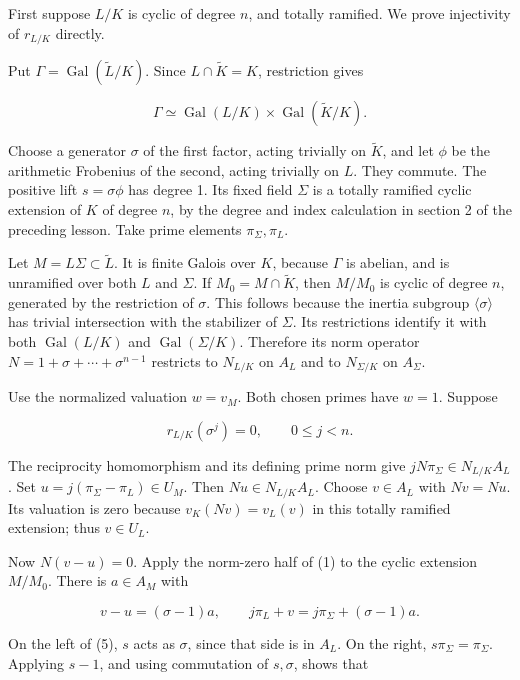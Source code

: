 \documentclass[11pt,a4paper]{article}
\begin{document}
First suppose \(L/K\) is cyclic of degree \(n\), and totally ramified.
We prove injectivity of \(r_{L/K}\) directly.

Put \(\Gamma=\operatorname{Gal}(\widetilde L/K)\). Since
\(L\cap\widetilde K=K\), restriction gives

\[
\Gamma\simeq\operatorname{Gal}(L/K)\times
\operatorname{Gal}(\widetilde K/K).
\]

Choose a generator \(\sigma\) of the first factor, acting trivially on
\(\widetilde K\), and let \(\phi\) be the arithmetic Frobenius of the
second, acting trivially on \(L\). They commute. The positive lift
\(s=\sigma\phi\) has degree 1. Its fixed field \(\Sigma\) is a totally
ramified cyclic extension of \(K\) of degree \(n\), by the degree and
index calculation in section 2 of the preceding lesson. Take prime
elements \(\pi_\Sigma,\pi_L\).

Let \(M=L\Sigma\subset\widetilde L\). It is finite Galois over \(K\),
because \(\Gamma\) is abelian, and is unramified over both \(L\) and
\(\Sigma\). If \(M_0=M\cap\widetilde K\), then \(M/M_0\) is cyclic of
degree \(n\), generated by the restriction of \(\sigma\). This follows
because the inertia subgroup \(\langle\sigma\rangle\) has trivial
intersection with the stabilizer of \(\Sigma\). Its restrictions
identify it with both \(\operatorname{Gal}(L/K)\) and
\(\operatorname{Gal}(\Sigma/K)\). Therefore its norm operator
\(N=1+\sigma+\cdots+\sigma^{n-1}\) restricts to \(N_{L/K}\) on \(A_L\)
and to \(N_{\Sigma/K}\) on \(A_\Sigma\).

Use the normalized valuation \(w=v_M\). Both chosen primes have \(w=1\).
Suppose

\[
r_{L/K}(\sigma^j)=0,\qquad 0\leq j<n.
\]

The reciprocity homomorphism and its defining prime norm give
\(jN\pi_\Sigma\in N_{L/K}A_L\). Set \(u=j(\pi_\Sigma-\pi_L)\in U_M\).
Then \(Nu\in N_{L/K}A_L\). Choose \(v\in A_L\) with \(Nv=Nu\). Its
valuation is zero because \(v_K(Nv)=v_L(v)\) in this totally ramified
extension; thus \(v\in U_L\).

Now \(N(v-u)=0\). Apply the norm-zero half of (1) to the cyclic
extension \(M/M_0\). There is \(a\in A_M\) with

\[
v-u=(\sigma-1)a,\qquad
j\pi_L+v=j\pi_\Sigma+(\sigma-1)a.
\tag{5}
\]

On the left of (5), \(s\) acts as \(\sigma\), since that side is in
\(A_L\). On the right, \(s\pi_\Sigma=\pi_\Sigma\). Applying \(s-1\), and
using commutation of \(s,\sigma\), shows that
\end{document}

